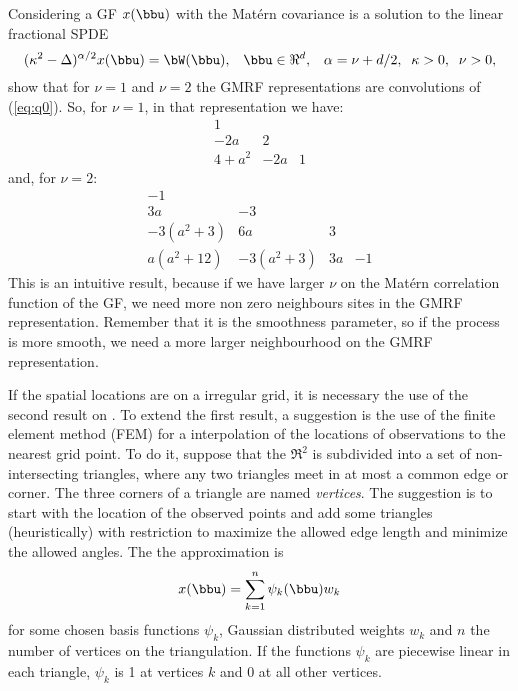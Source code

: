Considering a GF $x(\bbu)$ with the Mat\'ern 
covariance is a solution to the linear fractional SPDE 
\begin{equation}
(\kappa^2 - \Delta )^{\alpha/2}x(\bbu) = \bW (\bbu ),\;\;\;
\bbu \in \Re^d,\;\;\;\alpha=\nu+d/2,\;\;\kappa>0,\;\;\nu>0,
\end{equation}
\cite{lindgrenRL:2011} show that for $\nu=1$ and $\nu=2$ 
the GMRF representations are convolutions of (\ref{eq:q0}). 
So, for $\nu=1$, in that representation we have:
\begin{equation}
\begin{matrix}
1  & & \\
-2a & 2 & \\
4+a^2 & -2a & 1
\end{matrix}
\end{equation}\label{eq:q1}
and, for $\nu=2$:
\begin{equation}
\begin{matrix}
-1  & & &\\
3a & -3 & &\\
-3(a^2+3) & 6a & 3 & \\
a(a^2+12) & -3(a^2+3) & 3a & -1
\end{matrix}
\end{equation}\label{eq:q2}
This is an intuitive result, because if we have 
larger $\nu$ on the Mat\'ern correlation function of the GF, 
we need more non zero neighbours sites in the GMRF representation. 
Remember that it is the smoothness parameter, so if the 
process is more smooth, we need a more larger neighbourhood 
on the GMRF representation. 

If the spatial locations are on a irregular grid, 
it is necessary the use of the second result on
\cite{lindgrenRL:2011}. 
To extend the first result, a suggestion is the use of 
the finite element method (FEM) for a interpolation of 
the locations of observations to the nearest grid point. 
To do it, suppose that the $\Re^2$ is subdivided into 
a set of non-intersecting triangles, where any two
triangles meet in at most a common edge or corner. 
The three corners of a triangle are named \textit{vertices}.
The suggestion is to start with the location of the 
observed points and add some triangles (heuristically) 
with restriction to maximize the allowed edge length 
and minimize the allowed angles. 
The the approximation is 
\[x(\bbu) = \sum_{k=1}^{n}\psi_k(\bbu)w_k\]
for some chosen basis functions {$\psi_k$}, 
Gaussian distributed weights $w_k$ and $n$ the 
number of vertices on the triangulation.
If the functions $\psi_k$ are piecewise linear in each 
triangle, $\psi_k$ is 1 at vertices $k$ and 0 at all 
other vertices. 

